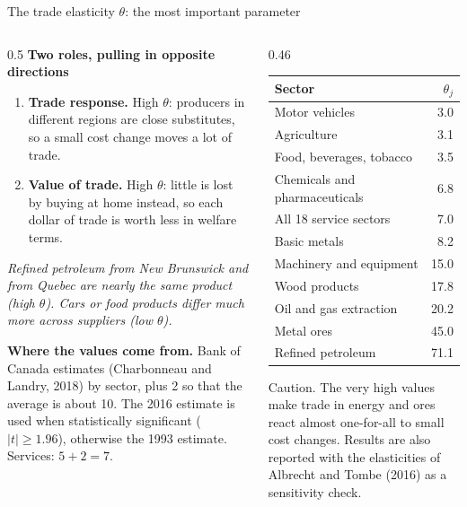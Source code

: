 \documentclass[aspectratio=169,9pt,t]{beamer}
\newcommand{\plain}[1]{{\color{ipgrey}\small\itshape #1}}
\begin{document}
\begin{frame}{The trade elasticity $\theta$: the most important parameter}
  \begin{columns}[T]
    \begin{column}{0.5\textwidth}
      \textbf{Two roles, pulling in opposite directions}
      \begin{enumerate}
        \item \textbf{Trade response.} High $\theta$: producers in
              different regions are close substitutes, so a small cost
              change moves a lot of trade.
        \item \textbf{Value of trade.} High $\theta$: little is lost by
              buying at home instead, so each dollar of trade is worth
              less in welfare terms.
      \end{enumerate}
      \plain{Refined petroleum from New Brunswick and from Quebec are
      nearly the same product (high $\theta$). Cars or food products
      differ much more across suppliers (low $\theta$).}

      \medskip
      \textbf{Where the values come from.} Bank of Canada estimates
      (Charbonneau and Landry, 2018) by sector, plus 2 so that the average
      is about 10. The 2016 estimate is used when statistically significant
      ($|t|\ge1.96$), otherwise the 1993 estimate. Services: $5+2=7$.
    \end{column}
    \begin{column}{0.46\textwidth}
      \centering\small
      \begin{tabular}{@{}lr@{}}
        \toprule
        Sector & $\theta_j$\\
        \midrule
        Motor vehicles & 3.0\\
        Agriculture & 3.1\\
        Food, beverages, tobacco & 3.5\\
        Chemicals and pharmaceuticals & 6.8\\
        All 18 service sectors & 7.0\\
        Basic metals & 8.2\\
        Machinery and equipment & 15.0\\
        Wood products & 17.8\\
        Oil and gas extraction & 20.2\\
        Metal ores & 45.0\\
        Refined petroleum & 71.1\\
        \bottomrule
      \end{tabular}

      \medskip
      \raggedright\footnotesize
      \alert{Caution.} The very high values make trade in energy and ores
      react almost one-for-all to small cost changes. Results are also
      reported with the elasticities of Albrecht and Tombe (2016) as a
      sensitivity check.
    \end{column}
  \end{columns}
\end{frame}
\end{document}
